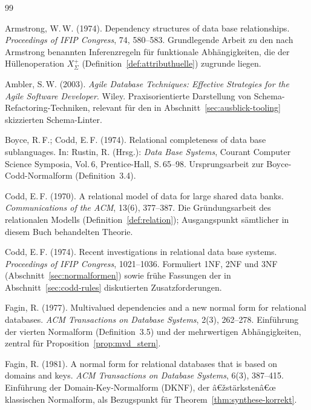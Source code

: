 ﻿\documentclass[a4paper,12pt]{report}
\theoremstyle{definition}
\theoremstyle{remark}
\begin{document}

\begin{thebibliography}{99}


Armstrong, W.\,W. (1974).
\newblock Dependency structures of data base relationships.
\newblock \emph{Proceedings of IFIP Congress}, 74, 580--583.
\newblock Grundlegende Arbeit zu den nach Armstrong benannten
Inferenzregeln für funktionale Abhängigkeiten, die der
Hüllenoperation $X^+_\Sigma$ (Definition~\ref{def:attributhuelle})
zugrunde liegen.

Ambler, S.\,W. (2003).
\newblock \emph{Agile Database Techniques: Effective Strategies for the Agile
Software Developer}.
\newblock Wiley.
\newblock Praxisorientierte Darstellung von Schema-Refactoring-Techniken,
relevant für den in Abschnitt~\ref{sec:ausblick-tooling} skizzierten
Schema-Linter.

Boyce, R.\,F.; Codd, E.\,F. (1974).
\newblock Relational completeness of data base sublanguages.
\newblock In: Rustin, R. (Hrsg.): \emph{Data Base Systems}, Courant Computer
Science Symposia, Vol.\,6, Prentice-Hall, S.\,65--98.
\newblock Ursprungsarbeit zur Boyce-Codd-Normalform (Definition~3.4).

Codd, E.\,F. (1970).
\newblock A relational model of data for large shared data banks.
\newblock \emph{Communications of the ACM}, 13(6), 377--387.
\newblock Die Gründungsarbeit des relationalen Modells
(Definition~\ref{def:relation}); Ausgangspunkt sämtlicher in diesem
Buch behandelten Theorie.

Codd, E.\,F. (1974).
\newblock Recent investigations in relational data base systems.
\newblock \emph{Proceedings of IFIP Congress}, 1021--1036.
\newblock Formuliert 1NF, 2NF und 3NF (Abschnitt~\ref{sec:normalformen})
sowie frühe Fassungen der in Abschnitt~\ref{sec:codd-rules}
diskutierten Zusatzforderungen.

Fagin, R. (1977).
\newblock Multivalued dependencies and a new normal form for relational
databases.
\newblock \emph{ACM Transactions on Database Systems}, 2(3), 262--278.
\newblock Einführung der vierten Normalform (Definition~3.5) und der
mehrwertigen Abhängigkeiten, zentral für
Proposition~\ref{prop:mvd_stern}.

Fagin, R. (1981).
\newblock A normal form for relational databases that is based on domains
and keys.
\newblock \emph{ACM Transactions on Database Systems}, 6(3), 387--415.
\newblock Einführung der Domain-Key-Normalform (DKNF), der
â€žstärkstenâ€œ klassischen Normalform, als Bezugspunkt für
Theorem~\ref{thm:synthese-korrekt}.


\end{thebibliography}
\end{document}
